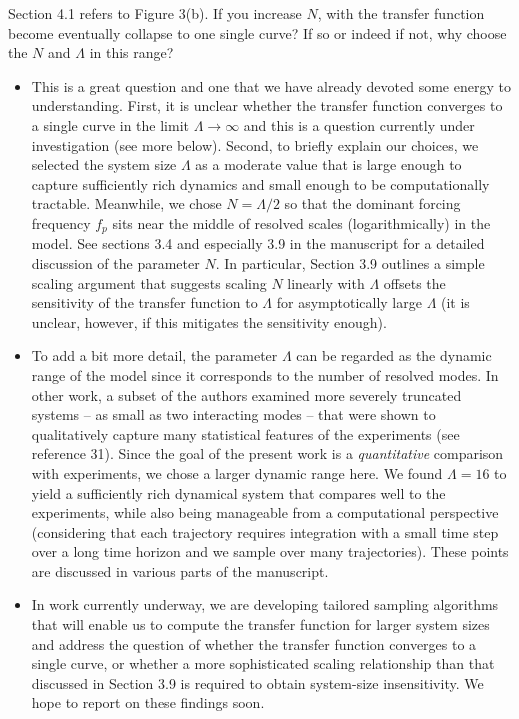 \documentclass[11pt]{article}
\newcommand{\comment}[1]{{\color{blue} #1}}
\begin{document}
\noindent
\comment{Section 4.1 refers to Figure 3(b). If you increase $N$, with the transfer function become eventually collapse to one single curve? If so or indeed if not, why choose the $N$ and $\Lambda$ in this range?}

\begin{itemize}
\item This is a great question and one that we have already devoted some energy to understanding. First, it is unclear whether the transfer function converges to a single curve in the limit $\Lambda \to \infty$ and this is a question currently under investigation (see more below). Second, to briefly explain our choices, we selected the system size $\Lambda$ as a moderate value that is large enough to capture sufficiently rich dynamics and small enough to be computationally tractable. Meanwhile, we chose $N = \Lambda / 2$ so that the dominant forcing frequency $f_p$ sits near the middle of resolved scales (logarithmically) in the model. See sections 3.4 and especially 3.9 in the manuscript for a detailed discussion of the parameter $N$. In particular, Section 3.9 outlines a simple scaling argument that suggests scaling $N$ linearly with $\Lambda$ offsets the sensitivity of the transfer function to $\Lambda$ for asymptotically large $\Lambda$ (it is unclear, however, if this mitigates the sensitivity enough).

\item To add a bit more detail, the parameter $\Lambda$ can be regarded as the dynamic range of the model since it corresponds to the number of resolved modes. In other work, a subset of the authors examined more severely truncated systems -- as small as two interacting modes -- that were shown to qualitatively capture many statistical features of the experiments (see reference 31). Since the goal of the present work is a {\em quantitative} comparison with experiments, we chose a larger dynamic range here. We found $\Lambda = 16$ to yield a sufficiently rich dynamical system that compares well to the experiments, while also being manageable from a computational perspective (considering that each trajectory requires integration with a small time step over a long time horizon and we sample over many trajectories). These points are discussed in various parts of the manuscript.
	
\item In  work currently underway, we are developing tailored sampling algorithms that will enable us to compute the transfer function for larger system sizes and address the question of whether the transfer function converges to a single curve, or whether a more sophisticated scaling relationship than that discussed in Section 3.9 is required to obtain system-size insensitivity. We hope to report on these findings soon.


\end{itemize}
\end{document}
